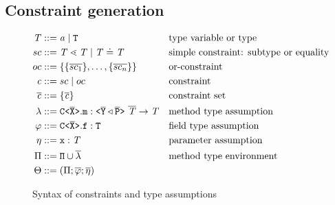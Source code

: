 \documentclass[a4paper,USenglish,cleveref, autoref, thm-restate]{lipics-v2021}
\begin{document}
\subsection{Constraint generation}
\label{sec:fjtype}
\begin{figure}[tp]
  \begin{align*}
    \mathit{T} &::= \mathit{ a } \mid {\tt T} && \text{type variable or type}\\
    sc &::= \mathit{T} \lessdot \mathit{T} \mid \mathit{T} \doteq \mathit{T} && \text{simple constraint: subtype or equality}\\
    oc{} &::= \{ \{ \overline{sc_1} \}, \ldots, \{ \overline{sc_n} \} \} && \text{or-constraint}\\
    \mathit{c} &::= sc\mid oc && \text{constraint}\\
    \overline{\mathit{c}} &::= \{ \mathit{\overline{c}} \} && \text{constraint set}\\
    \mathtt{\lambda} &::= \mathtt{C \texttt{<} \overline{\tt X} \texttt{>} }.\texttt{m} : \mathtt{ \texttt{<} \overline{\tt Y}
                        \triangleleft \overline{\tt P} \texttt{>} }\ \overline{\tt \mathit{T}} \to \mathit{T}  &&
                                                                \text{method
                                                                type assumption}\\
    \mathtt{\varphi} &::= \mathtt{C \texttt{<} \overline{\tt X} \texttt{>} }.\texttt{f} : \texttt{T} && \text{field type assumption}\\
    \mathtt{\eta} &::= \texttt{x} : \mathit{T} && \text{parameter
                                                       assumption}\\
    \Pi & ::= {\tt \Pi} \cup \overline{\mathtt{\lambda}} &
                & \text{method type environment} \\
    \Theta &::= ({\Pi} ; \overline{\mathtt{\varphi}}; \overline{\mathtt{\eta}}) 
  \end{align*}
  \caption{Syntax of constraints and type assumptions}
  \label{fig:syntax-constraints}
\end{figure}
\end{document}
